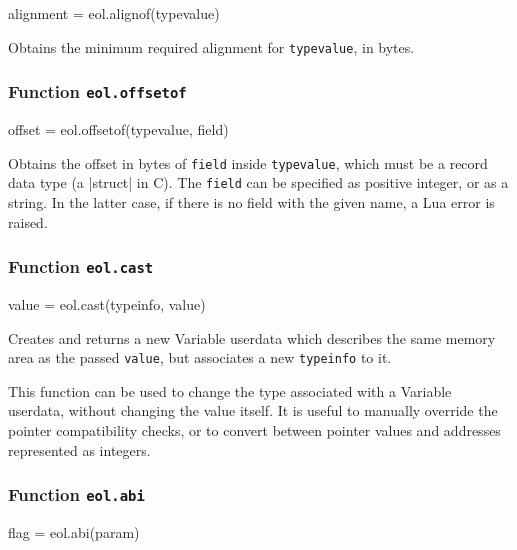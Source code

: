 \begin{luacode}
	alignment = eol.alignof(typevalue)
\end{luacode}

Obtains the minimum required alignment for \texttt{typevalue}, in bytes.


\subsubsection{Function \texttt{eol.offsetof}}
	\label{sec:eol-api-offsetof}

\begin{luacode}
offset = eol.offsetof(typevalue, field)
\end{luacode}

Obtains the offset in bytes of \texttt{field} inside \texttt{typevalue}, which
must be a record data type (a \Mc|struct| in C). The \texttt{field} can be
specified as positive integer, or as a string. In the latter case, if there is
no field with the given name, a Lua error is raised.

\subsubsection{Function \texttt{eol.cast}}
	\label{sec:eol-api-cast}

\begin{luacode}
	value = eol.cast(typeinfo, value)
\end{luacode}

Creates and returns a new \textsf{Variable} userdata which describes the same
memory area as the passed \texttt{value}, but associates a new
\texttt{typeinfo} to it.

This function can be used to change the type associated with a \textsf{Variable}
userdata, without changing the value itself. It is useful to manually override
the pointer compatibility checks, or to convert between pointer values and
addresses represented as integers.

%
%
%
%
%


\subsubsection{Function \texttt{eol.abi}}
	\label{sec:eol-api-abi}

\begin{luacode}
flag = eol.abi(param)
\end{luacode}

